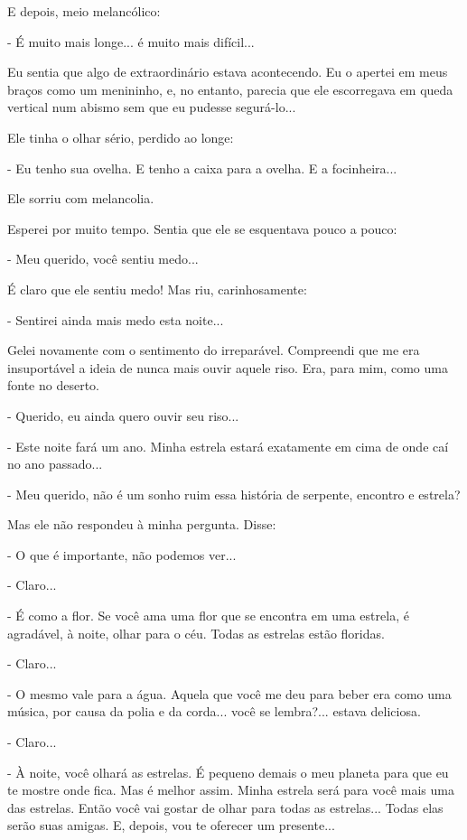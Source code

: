 E depois, meio melancólico:

- É muito mais longe... é muito mais difícil...

Eu sentia que algo de extraordinário estava acontecendo. Eu o apertei em
meus braços como um menininho, e, no entanto, parecia que ele
escorregava em queda vertical num abismo sem que eu pudesse segurá-lo...

Ele tinha o olhar sério, perdido ao longe:

- Eu tenho sua ovelha. E tenho a caixa para a ovelha. E a focinheira...

Ele sorriu com melancolia.

Esperei por muito tempo. Sentia que ele se esquentava pouco a pouco:

- Meu querido, você sentiu medo...

É claro que ele sentiu medo! Mas riu, carinhosamente:

- Sentirei ainda mais medo esta noite...

Gelei novamente com o sentimento do irreparável. Compreendi que me era
insuportável a ideia de nunca mais ouvir aquele riso. Era, para mim,
como uma fonte no deserto.

- Querido, eu ainda quero ouvir seu riso...

- Este noite fará um ano. Minha estrela estará exatamente em cima de
onde caí no ano passado...

- Meu querido, não é um sonho ruim essa história de serpente, encontro e
estrela?

Mas ele não respondeu à minha pergunta. Disse:

- O que é importante, não podemos ver...

- Claro...

- É como a flor. Se você ama uma flor que se encontra em uma estrela, é
agradável, à noite, olhar para o céu. Todas as estrelas estão floridas.

- Claro...

- O mesmo vale para a água. Aquela que você me deu para beber era como
uma música, por causa da polia e da corda... você se lembra?... estava
deliciosa.

- Claro...

- À noite, você olhará as estrelas. É pequeno demais o meu planeta para
que eu te mostre onde fica. Mas é melhor assim. Minha estrela será para
você mais uma das estrelas. Então você vai gostar de olhar para todas as
estrelas... Todas elas serão suas amigas. E, depois, vou te oferecer um
presente...

